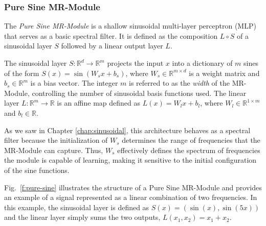 


\subsubsection{Pure Sine MR-Module}

The \textit{Pure Sine MR-Module} is a shallow sinusoidal multi-layer perceptron (MLP) that serves as a basic spectral filter. It is defined as the composition \( L \circ S \) of a sinusoidal layer \( S \) followed by a linear output layer \( L \). 

The sinusoidal layer \( S\!:\!\mathbb{R}^d\!\to\! \mathbb{R}^m \) projects the input \( x \) into a dictionary of \( m \) sines of the form \( S(x) = \sin\left(W_s x + b_s\right) \), where \( W_s \in \mathbb{R}^{m \times d} \) is a weight matrix and \( b_s \in \mathbb{R}^m \) is a bias vector. The integer \( m \) is referred to as the \textit{width} of the MR-Module, controlling the number of sinusoidal basis functions used. The linear layer \( L\!:\!\mathbb{R}^m\!\to\! \mathbb{R} \) is an affine map defined as \( L(x) = W_l x + b_l \), where \( W_l \in \mathbb{R}^{1 \times m} \) and \( b_l \in \mathbb{R} \).

As we saw in Chapter \ref{chap:sinusoidal}, this architecture behaves as a spectral filter because the initialization of \( W_s \) determines the range of frequencies that the MR-Module can capture. 
Thus, \( W_s \) effectively defines the spectrum of frequencies the module is capable of learning, making it sensitive to the initial configuration of the sine functions.

Fig.~\ref{f:pure-sine} illustrates the structure of a Pure Sine MR-Module and provides an example of a signal represented as a linear combination of two frequencies. In this example, the sinusoidal layer is defined as \( S(x) = (\sin(x), \sin(5x)) \) and the linear layer simply sums the two outputs, \( L(x_1, x_2) = x_1 + x_2 \).

